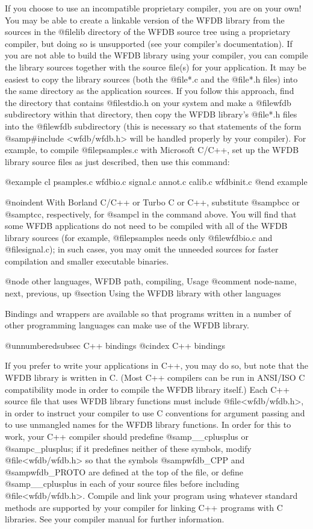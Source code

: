 {If you choose to use an incompatible proprietary compiler, you are on
your own!  You may be able to create a linkable version of the WFDB
library from the sources in the @file{lib} directory of the WFDB source
tree using a proprietary compiler, but doing so is unsupported (see your
compiler's documentation).  If you are not able to build the WFDB
library using your compiler, you can compile the library sources
together with the source file(s) for your application.  It may be
easiest to copy the library sources (both the @file{*.c} and the
@file{*.h} files) into the same directory as the application sources.
If you follow this approach, find the directory that contains @file{stdio.h}
on your system and make a @file{wfdb} subdirectory within that directory,
then copy the WFDB library's @file{*.h} files into the @file{wfdb}
subdirectory (this is necessary so that statements of the form
@samp{#include <wfdb/wfdb.h>} will be handled properly by your compiler).
For example, to compile @file{psamples.c} with Microsoft C/C++, set up
the WFDB library source files as just described, then use this command:

@example
cl psamples.c wfdbio.c signal.c annot.c calib.c wfdbinit.c
@end example

@noindent
With Borland C/C++ or Turbo C or C++, substitute @samp{bcc} or
@samp{tcc}, respectively, for @samp{cl} in the command above.  You will
find that some WFDB applications do not need to be compiled with all of
the WFDB library sources (for example, @file{psamples} needs only
@file{wfdbio.c} and @file{signal.c}); in such cases, you may omit the
unneeded sources for faster compilation and smaller executable binaries.


@node     other languages, WFDB path, compiling, Usage
@comment  node-name,  next,  previous,  up
@section Using the WFDB library with other languages

Bindings and wrappers are available so that programs written in a
number of other programming languages can make use of the WFDB library.

@unnumberedsubsec C++ bindings
@cindex C++ bindings

If you prefer to write your applications in C++, you may do so, but note
that the WFDB library is written in C.  (Most C++ compilers can be run
in ANSI/ISO C compatibility mode in order to compile the WFDB library
itself.)  Each C++ source file that uses WFDB library functions must
include @file{<wfdb/wfdb.h>}, in order to instruct your compiler to use
C conventions for argument passing and to use unmangled names for the
WFDB library functions.  In order for this to work, your C++ compiler
should predefine @samp{__cplusplus} or @samp{c_plusplus}; if it
predefines neither of these symbols, modify @file{<wfdb/wfdb.h>} so that
the symbols @samp{wfdb_CPP} and @samp{wfdb_PROTO} are defined at the top
of the file, or define @samp{__cplusplus} in each of your source files
before including @file{<wfdb/wfdb.h>}.  Compile and link your program
using whatever standard methods are supported by your compiler for
linking C++ programs with C libraries.  See your compiler manual for
further information.

}
